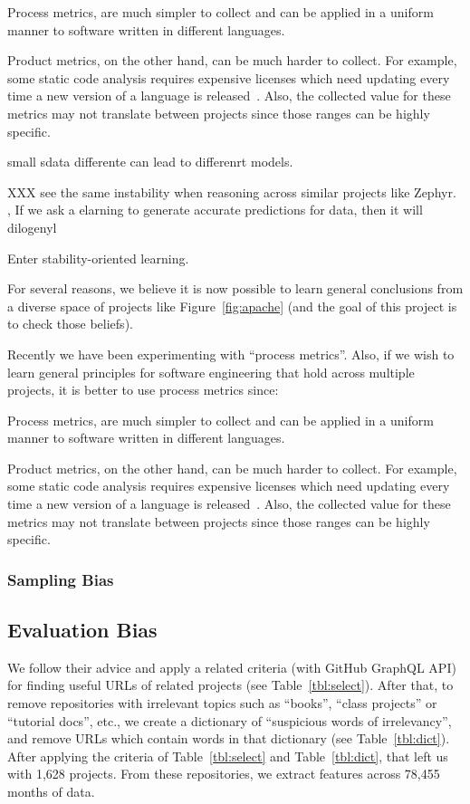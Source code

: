 Process metrics, are much simpler to collect and can be applied in a uniform manner to software written in different languages.  
 
Product metrics, on the other hand,  can be much harder to collect.
For example, some  static code analysis requires expensive licenses which need updating every time a new version of a language is released~\cite{Devanbu14}.
Also, the collected value for these metrics may not translate between projects since those ranges can be highly specific.
 
 

small sdata differente can lead to differenrt models.

XXX see the same instability when reasoning across similar projects like Zephyr. , If we ask a elarning to generate accurate predictions for data, then it will dilogenyl 

Enter stability-oriented learning. 

For several reasons, we believe it is now possible to learn general conclusions from a diverse space of projects like Figure~\ref{fig:apache} (and the goal of this project is to check those beliefs).
 
Recently we have been experimenting with ``process metrics''.
Also, if we wish to learn general principles for software engineering that hold across multiple projects, it is better to use process metrics since:
 
Process metrics, are much simpler to collect and can be applied in a uniform manner to software written in different languages.  
 
Product metrics, on the other hand,  can be much harder to collect.
For example, some  static code analysis requires expensive licenses which need updating every time a new version of a language is released~\cite{Devanbu14}.
Also, the collected value for these metrics may not translate between projects since those ranges can be highly specific.
 
 
  \subsubsection{Sampling Bias}

\subsection{Evaluation Bias}
We follow their advice and apply a related criteria (with GitHub GraphQL API) for finding useful URLs of related projects (see Table~\ref{tbl:select}).
After that, to remove repositories with irrelevant topics such as ``books'', ``class projects'' or ``tutorial docs'', etc., we create a dictionary of ``suspicious words of irrelevancy'', and remove URLs which contain words in that dictionary (see  Table~\ref{tbl:dict}). After applying the criteria of Table~\ref{tbl:select} and Table~\ref{tbl:dict}, that left us with 1,628 projects. From these repositories, we extract features across 78,455 months of data.

